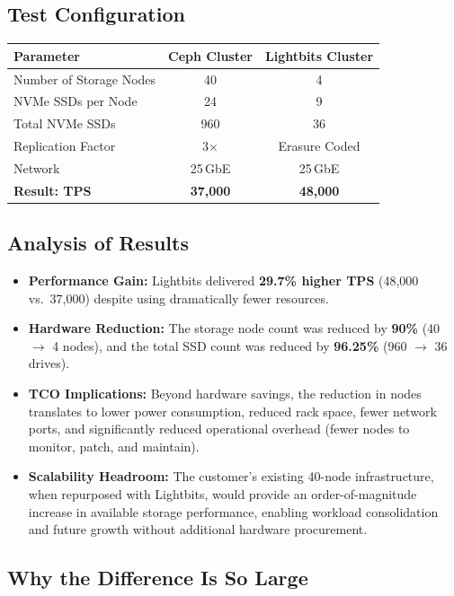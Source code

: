 \documentclass[12pt,a4paper,oneside]{report}
\begin{document}
\subsection{Test Configuration}

\begin{center}
\begin{tabular}{@{} l c c @{}}
\toprule
\textbf{Parameter} & \textbf{Ceph Cluster} & \textbf{Lightbits Cluster} \\
\midrule
Number of Storage Nodes & 40 & 4 \\
NVMe SSDs per Node & 24 & 9 \\
Total NVMe SSDs & 960 & 36 \\
Replication Factor & 3$\times$ & Erasure Coded \\
Network & 25\,GbE & 25\,GbE \\
\midrule
\textbf{Result: TPS} & \textbf{37,000} & \textbf{48,000} \\
\bottomrule
\end{tabular}
\end{center}

\subsection{Analysis of Results}

\begin{itemize}
    \item \textbf{Performance Gain:} Lightbits delivered \textbf{29.7\% higher TPS} (48,000 vs.\ 37,000) despite using dramatically fewer resources.
    \item \textbf{Hardware Reduction:} The storage node count was reduced by \textbf{90\%} (40 $\to$ 4 nodes), and the total SSD count was reduced by \textbf{96.25\%} (960 $\to$ 36 drives).
    \item \textbf{TCO Implications:} Beyond hardware savings, the reduction in nodes translates to lower power consumption, reduced rack space, fewer network ports, and significantly reduced operational overhead (fewer nodes to monitor, patch, and maintain).
    \item \textbf{Scalability Headroom:} The customer's existing 40-node infrastructure, when repurposed with Lightbits, would provide an order-of-magnitude increase in available storage performance, enabling workload consolidation and future growth without additional hardware procurement.
\end{itemize}

\subsection{Why the Difference Is So Large}
\end{document}
